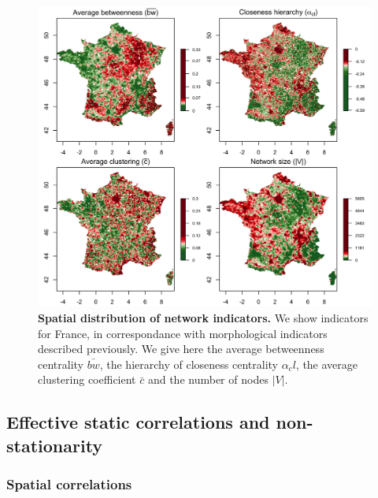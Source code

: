 \documentclass[11pt]{article}
\begin{document}
\begin{figure}
\includegraphics[width=\linewidth]{indics_network_en_areasize100_offset50_factor0_5.png}
\caption{\textbf{Spatial distribution of network indicators.} We show indicators for France, in correspondance with morphological indicators described previously. We give here the average betweenness centrality $\bar{bw}$, the hierarchy of closeness centrality $\alpha_cl$, the average clustering coefficient $\bar{c}$ and the number of nodes $\left|V\right|$.\label{fig:staticcorrs:network}}
\end{figure}


\subsection{Effective static correlations and non-stationarity}


\subsubsection{Spatial correlations}
\end{document}
